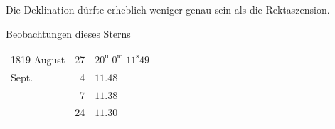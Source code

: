 \par\indent Die Deklination dürfte erheblich weniger genau sein als die Rektaszension.

\par\indent [Handschrift:] Beobachtungen dieses Sterns
\begin{center}\fontsize{10}{12}\selectfont\begin{tabular}{lrl}
1819 August & 27 & $20^{\mathrm u}\;0^{\mathrm m}\;11^{\mathrm s}49$\\
Sept. & 4 & $11.48$\\
& 7 & $11.38$\\
& 24 & $11.30$\\
\end{tabular}\end{center}

